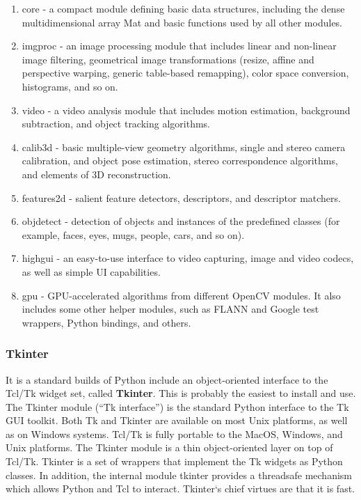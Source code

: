 \documentclass[12pt, a4paper]{article}
\begin{document}
\begin{enumerate}
\item core - a compact module defining basic data structures, including the dense
multidimensional array Mat and basic functions used by all other modules.
\item imgproc - an image processing module that includes linear and non-linear image
filtering, geometrical image transformations (resize, affine and perspective warping,
generic table-based remapping), color space conversion, histograms, and so on.
\item video - a video analysis module that includes motion estimation, background
subtraction, and object tracking algorithms.
\item calib3d - basic multiple-view geometry algorithms, single and stereo camera
calibration, and object pose estimation, stereo correspondence algorithms, and
elements of 3D reconstruction.
\item features2d - salient feature detectors, descriptors, and descriptor matchers.
\item objdetect - detection of objects and instances of the predefined classes (for
example, faces, eyes, mugs, people, cars, and so on).
\item highgui - an easy-to-use interface to video capturing, image and video codecs, as
well as simple UI capabilities.
\item gpu - GPU-accelerated algorithms from different OpenCV modules.
It also includes some other helper modules, such as FLANN and Google test wrappers,
Python bindings, and others.
\end{enumerate}

\subsubsection{Tkinter}

It is a standard builds of Python include an object-oriented interface to the Tcl/Tk widget set,
called \textbf{Tkinter}. This is probably the easiest to install and use. The Tkinter module (“Tk interface”) is the standard Python interface to the Tk GUI toolkit.
Both Tk and Tkinter are available on most Unix platforms, as well as on Windows
systems. Tcl/Tk is fully portable to the MacOS, Windows, and Unix platforms.
The Tkinter module is a thin object-oriented layer on top of Tcl/Tk. Tkinter is a set of
wrappers that implement the Tk widgets as Python classes. In addition, the internal module
tkinter provides a threadsafe mechanism which allows Python and Tcl to interact.
Tkinter‘s chief virtues are that it is fast.
\end{document}

